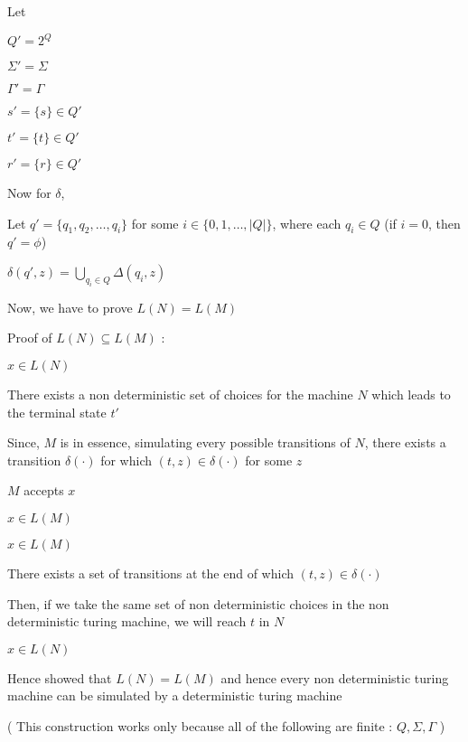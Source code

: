 \begin{enumerate}
Let 

$Q' = 2 ^ {Q}$

$\Sigma' = \Sigma$

$\Gamma' = \Gamma$

$s' = \{s\} \in Q'$

$t' = \{ t \} \in Q'$

$r' = \{ r \} \in Q'$

Now for $\delta$,

Let $q' = \{q_1, q_2, \dots, q_i\}$ for some $i \in \{0, 1, \dots, |Q|\}$, where each $q_i \in Q$ (if $i = 0$, then $q' = \phi$)

$\delta(q', z) = \bigcup_{q_i \in Q}{\Delta(q_i, z)}$

Now, we have to prove $L(N) = L(M)$

Proof of $L(N) \subseteq L(M)$ : 

$x \in L(N)$

\imp
There exists a non deterministic set of choices for the machine $N$ which leads to the terminal state $t'$

\imp
Since, $M$ is in essence, simulating every possible transitions of $N$, there exists a transition $\delta(\cdot) $ for which $(t, z) \in \delta(\cdot)$ for some $z$

\imp
$M$ accepts $x$

\imp
$x \in L(M)$


$x \in L(M)$

\imp
There exists a set of transitions at the end of which $(t, z) \in \delta(\cdot)$

\imp
Then, if we take the same set of non deterministic choices in the non deterministic turing machine, we will reach $t$ in $N$

\imp
$x \in L(N)$

Hence showed that $L(N) = L(M)$ and hence every non deterministic turing machine can be simulated by a deterministic turing machine

(
This construction works only because all of the following are finite : 
$Q, \Sigma, \Gamma$
)

\end{enumerate}
